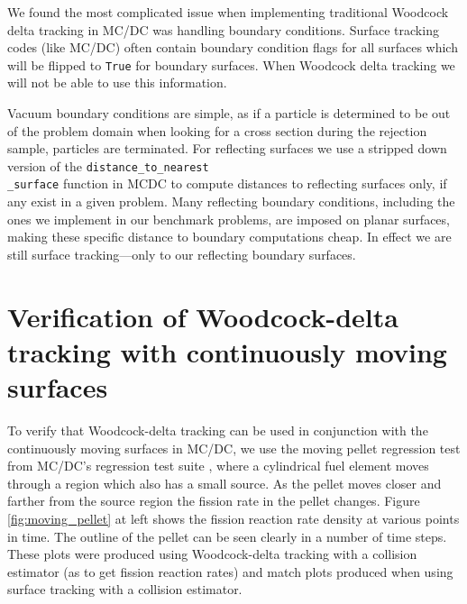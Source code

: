
We found the most complicated issue when implementing traditional Woodcock delta tracking in MC/DC was handling boundary conditions.
Surface tracking codes (like MC/DC) often contain boundary condition flags for all surfaces which will be flipped to \texttt{True} for boundary surfaces.
When Woodcock delta tracking we will not be able to use this information.

Vacuum boundary conditions are simple, as if a particle is determined to be out of the problem domain when looking for a cross section during the rejection sample, particles are terminated.
For reflecting surfaces we use a stripped down version of the \texttt{distance\_to\_nearest\\\_surface} function in MCDC to compute distances to reflecting surfaces only, if any exist in a given problem.
Many reflecting boundary conditions, including the ones we implement in our benchmark problems, are imposed on planar surfaces, making these specific distance to boundary computations cheap.
In effect we are still surface tracking---only to our reflecting boundary surfaces.

\section{Verification of Woodcock-delta tracking with continuously moving surfaces}

To verify that Woodcock-delta tracking can be used in conjunction with the continuously moving surfaces in MC/DC, we use the moving pellet regression test from MC/DC's regression test suite \cite{morgan_monte_2024}, where a cylindrical fuel element moves through a region which also has a small source.
As the pellet moves closer and farther from the source region the fission rate in the pellet changes.
Figure \ref{fig:moving_pellet} at left shows the fission reaction rate density at various points in time.
The outline of the pellet can be seen clearly in a number of time steps.
These plots were produced using Woodcock-delta tracking with a collision estimator (as to get fission reaction rates) and match plots produced when using surface tracking with a collision estimator.

